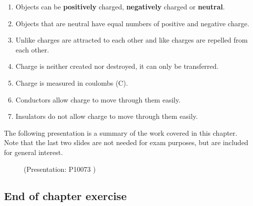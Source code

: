       
      \label{m38781*id201947}\begin{enumerate}[noitemsep, label=\textbf{\arabic*}. ] 
            \label{m38781*uid14}\item Objects can be \textbf{positively} charged, \textbf{negatively} charged or \textbf{neutral}.
\label{m38781*uid15}\item Objects that are neutral have equal numbers of positive and negative charge.
\label{m38781*uid16}\item Unlike charges are attracted to each other and like charges are repelled from each other.
\label{m38781*uid17}\item Charge is neither created nor destroyed, it can only be transferred.
\label{m38781*uid18}\item Charge is measured in coulombs (C).
\label{m38781*uid19}\item Conductors allow charge to move through them easily.
\label{m38781*uid20}\item Insulators do not allow charge to move through them easily.
\end{enumerate}
        \label{m38781*eip-152}The following presentation is a summary of the work covered in this chapter. Note that the last two slides are not needed for exam purposes, but are included for general interest.\newline
    

    \setcounter{subfigure}{0}


	\begin{figure}[H] %
    
    \label{m38781*slidesharemedia}\label{m38781*slideshareflash} { (Presentation:  P10073 )}
      
      \vspace{2pt}
    \vspace{.1in}
    
    

 \end{figure}   

    \addtocounter{footnote}{-0}
    \par 
    
    \label{m38781*cid10}
            \subsection{ End of chapter exercise}
            \nopagebreak
            
